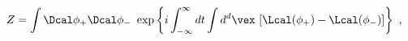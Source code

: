 \begin{equation}
  Z = \int \Dcal \phi_+ \Dcal \phi_-~\exp \left\{
  i \int^{\infty}_{-\infty}dt \int d^d\vex~[\Lcal (\phi_+)-\Lcal (\phi_-)]
  \right\} \ ,
\label{Zorbi}
\end{equation}

